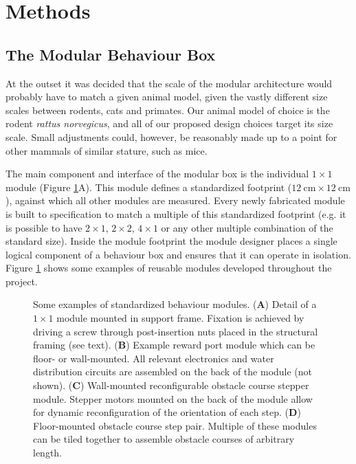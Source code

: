 
\section{Methods}

\subsection{The Modular Behaviour Box}

At the outset it was decided that the scale of the modular architecture would probably have to match a given animal model, given the vastly different size scales between rodents, cats and primates. Our animal model of choice is the rodent \emph{rattus norvegicus}, and all of our proposed design choices target its size scale. Small adjustments could, however, be reasonably made up to a point for other mammals of similar stature, such as mice.

The main component and interface of the modular box is the individual $1\times 1$ module (Figure \ref{fig:modules}A). This module defines a standardized footprint ($\SI{12}{\centi\meter}\times \SI{12}{\centi\meter}$), against which all other modules are measured. Every newly fabricated module is built to specification to match a multiple of this standardized footprint (e.g. it is possible to have $2\times 1$, $2\times 2$, $4\times 1$ or any other multiple combination of the standard size). Inside the module footprint the module designer places a single logical component of a behaviour box and ensures that it can operate in isolation. Figure \ref{fig:modules} shows some examples of reusable modules developed throughout the project.

\begin{figure}
\centering

\caption{Some examples of standardized behaviour modules. (\textbf{A}) Detail of a $1\times 1$ module mounted in support frame. Fixation is achieved by driving a screw through post-insertion nuts placed in the structural framing (see text). (\textbf{B}) Example reward port module which can be floor- or wall-mounted. All relevant electronics and water distribution circuits are assembled on the back of the module (not shown). (\textbf{C}) Wall-mounted reconfigurable obstacle course stepper module. Stepper motors mounted on the back of the module allow for dynamic reconfiguration of the orientation of each step. (\textbf{D}) Floor-mounted obstacle course step pair. Multiple of these modules can be tiled together to assemble obstacle courses of arbitrary length.}
\label{fig:modules}
\end{figure}


